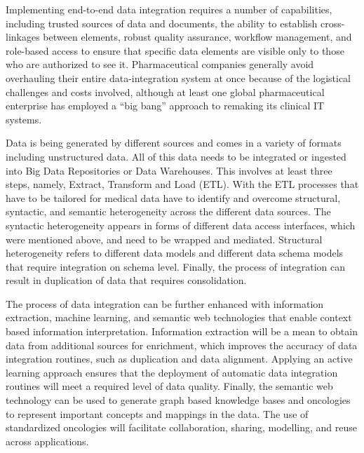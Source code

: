 \documentclass[sigconf]{acmart}
\begin{document}
Implementing end-to-end data integration requires a number of
capabilities, including trusted sources of data and documents, the
ability to establish cross-linkages between elements, robust quality
assurance, workflow management, and role-based access to ensure that
specific data elements are visible only to those who are authorized
to see it. Pharmaceutical companies generally avoid overhauling their
entire data-integration system at once because of the logistical
challenges and costs involved, although at least one global 
pharmaceutical enterprise has employed a ``big bang'' approach to 
remaking its clinical IT systems\cite{TR02}.

Data is being generated by different sources and comes in a variety
of formats including unstructured data. All of this data needs to 
be integrated or ingested into Big Data Repositories or Data 
Warehouses. This involves at least three steps, namely, Extract, 
Transform and Load (ETL). With the ETL processes that have to be 
tailored for medical data have to identify and overcome structural,
syntactic, and semantic heterogeneity across the different data 
sources. The syntactic heterogeneity appears in forms of different 
data access interfaces, which were mentioned above, and need to be
wrapped and mediated. Structural heterogeneity refers to different
data models and different data schema models that require 
integration on schema level. Finally, the process of integration 
can result in duplication of data that requires consolidation.

The process of data integration can be further enhanced with 
information extraction, machine learning, and semantic web 
technologies that enable context based information interpretation.
Information extraction will be a mean to obtain data from additional
sources for enrichment, which improves the accuracy of data 
integration routines, such as duplication and data alignment. 
Applying an active learning approach ensures that the deployment of
automatic data integration routines will meet a required level of 
data quality. Finally, the semantic web technology can be used to 
generate graph based knowledge bases and oncologies to represent 
important concepts and mappings in the data. The use of standardized 
oncologies will facilitate collaboration, sharing, modelling, and 
reuse across applications\cite{TR04}.
\end{document}
